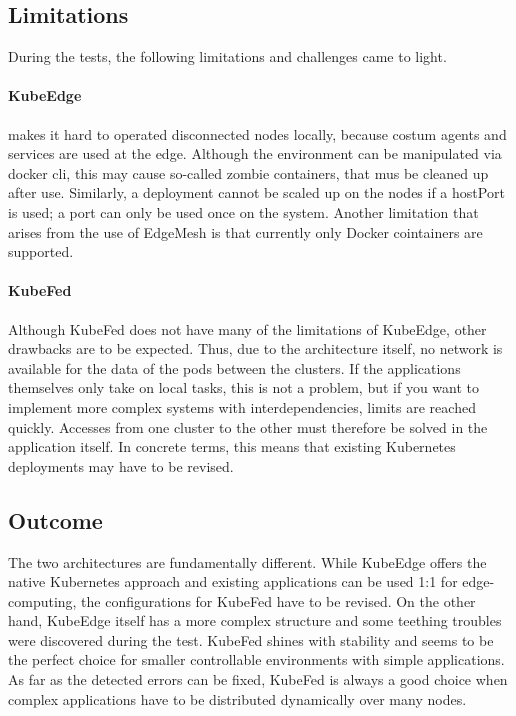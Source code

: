 \documentclass[MSC,Master,english]{twbook}%
\begin{document}
\subsection{Limitations}
During the tests, the following limitations and challenges came to light.

\paragraph{KubeEdge} makes it hard to operated disconnected nodes locally, because costum agents and services are used at the edge. Although the environment can be manipulated via docker cli, this may cause so-called zombie containers, that mus be cleaned up after use. Similarly, a deployment cannot be scaled up on the nodes if a hostPort is used; a port can only be used once on the system. Another limitation that arises from the use of EdgeMesh is that currently only Docker cointainers are supported.

\paragraph{KubeFed} Although KubeFed does not have many of the limitations of KubeEdge, other drawbacks are to be expected. Thus, due to the architecture itself, no network is available for the data of the pods between the clusters. If the applications themselves only take on local tasks, this is not a problem, but if you want to implement more complex systems with interdependencies, limits are reached quickly. Accesses from one cluster to the other must therefore be solved in the application itself. In concrete terms, this means that existing Kubernetes deployments may have to be revised.

\subsection{Outcome} The two architectures are fundamentally different. While KubeEdge offers the native Kubernetes approach and existing applications can be used 1:1 for edge-computing, the configurations for KubeFed have to be revised. On the other hand, KubeEdge itself has a more complex structure and some teething troubles were discovered during the test. KubeFed shines with stability and seems to be the perfect choice for smaller controllable environments with simple applications. As far as the detected errors can be fixed, KubeFed is always a good choice when complex applications have to be distributed dynamically over many nodes.
\end{document}

